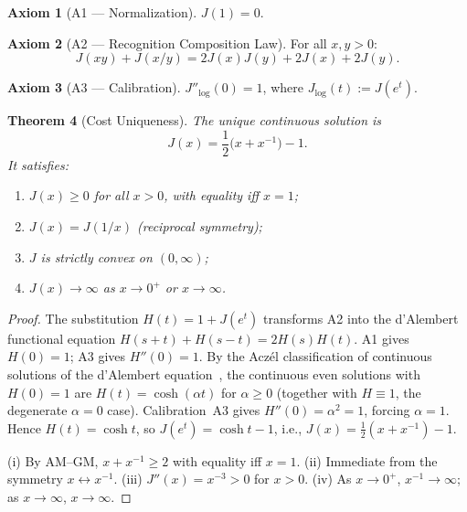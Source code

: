 \documentclass[12pt,a4paper]{article}
\newtheorem{theorem}{Theorem}[section]
\theoremstyle{definition}
\newtheorem{axiom_rs}[theorem]{Axiom}
\theoremstyle{remark}
\begin{document}
\begin{axiom_rs}[A1 --- Normalization]
$J(1) = 0$.
\end{axiom_rs}

\begin{axiom_rs}[A2 --- Recognition Composition Law]
For all $x, y > 0$:
\begin{equation}
\label{eq:RCL}
  J(xy) + J(x/y) = 2J(x)J(y) + 2J(x) + 2J(y).
\end{equation}
\end{axiom_rs}

\begin{axiom_rs}[A3 --- Calibration]
$J''_{\log}(0) = 1$, where $J_{\log}(t) := J(e^t)$.
\end{axiom_rs}

\begin{theorem}[Cost Uniqueness]
\label{thm:J}
The unique continuous solution is
\begin{equation}
  J(x) = \frac{1}{2}\bigl(x + x^{-1}\bigr) - 1.
\end{equation}
It satisfies:
\begin{enumerate}[label=(\roman*),nosep]
  \item $J(x) \geq 0$ for all $x > 0$, with equality iff $x = 1$;
  \item $J(x) = J(1/x)$ (reciprocal symmetry);
  \item $J$ is strictly convex on $(0, \infty)$;
  \item $J(x) \to \infty$ as $x \to 0^+$ or $x \to \infty$.
\end{enumerate}
\end{theorem}

\begin{proof}
The substitution $H(t) = 1 + J(e^t)$ transforms A2 into the d'Alembert
functional equation $H(s+t) + H(s-t) = 2H(s)H(t)$.  A1 gives $H(0) = 1$; A3
gives $H''(0) = 1$.  By the Acz\'el classification of continuous solutions
of the d'Alembert equation~\cite{Aczel1966}, the continuous even solutions
with $H(0) = 1$ are $H(t) = \cosh(\alpha t)$ for $\alpha \geq 0$
(together with $H \equiv 1$, the degenerate $\alpha = 0$ case).
Calibration~A3 gives $H''(0) = \alpha^2 = 1$, forcing $\alpha = 1$.
Hence $H(t) = \cosh t$, so $J(e^t) = \cosh t - 1$, i.e.,
$J(x) = \tfrac{1}{2}(x + x^{-1}) - 1$.

(i) By AM--GM, $x + x^{-1} \geq 2$ with equality iff $x = 1$.
(ii) Immediate from the symmetry $x \leftrightarrow x^{-1}$.
(iii) $J''(x) = x^{-3} > 0$ for $x > 0$.
(iv) As $x \to 0^+$, $x^{-1} \to \infty$; as $x \to \infty$,
$x \to \infty$.
\end{proof}
\end{document}
